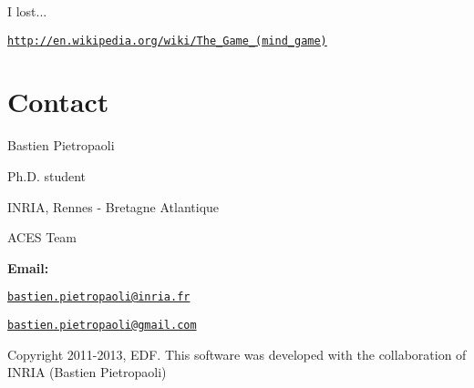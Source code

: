 I lost...

\href{http://en.wikipedia.org/wiki/The_Game_(mind_game)}{\tt http://en.wikipedia.org/wiki/The\_\-Game\_\-(mind\_\-game)}\hypertarget{origin_page_Origin_contact}{}\section{Contact}\label{origin_page_Origin_contact}
Bastien Pietropaoli \par
 Ph.D. student \par
 INRIA, Rennes -\/ Bretagne Atlantique \par
 ACES Team \par


{\bfseries Email:} \par
 \href{mailto:bastien.pietropaoli@inria.fr}{\tt bastien.pietropaoli@inria.fr} \par
 \href{mailto:bastien.pietropaoli@gmail.com}{\tt bastien.pietropaoli@gmail.com} \par


Copyright 2011-\/2013, EDF. This software was developed with the collaboration of INRIA (Bastien Pietropaoli) 